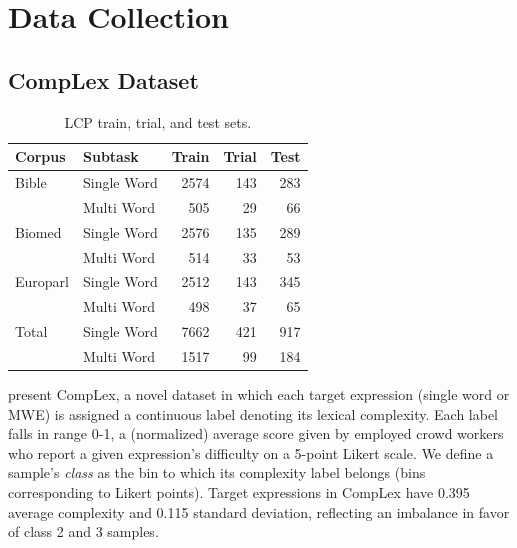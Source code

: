\documentclass{dcthesis}
\theoremstyle{definition}
\theoremstyle{remark}
\begin{document}
\chapter{Data Collection}

\section{CompLex Dataset}

\begin{table}
  \centering
  \begin{tabular}{l|l|r|r|r}
    \toprule
    \centering
    Corpus & Subtask & Train &  Trial &  Test \\
    \midrule
    Bible & Single Word &   2574 &    143 &   283 \\
            & Multi Word &    505 &     29 &    66 \\
    Biomed & Single Word &   2576 &    135 &   289 \\
            & Multi Word &    514 &     33 &    53 \\
    Europarl & Single Word &   2512 &    143 &   345 \\
            & Multi Word &    498 &     37 &    65 \\
    \midrule
    Total & Single Word & 7662 & 421 & 917 \\
          & Multi Word &    1517 &     99 &    184 \\
    \bottomrule
  \end{tabular}
  \caption{\label{tab:datasets} LCP train, trial, and test sets.}
\end{table}

\citet{shardlow2020complex} present CompLex, a novel dataset in which each target expression (single word or MWE) is assigned a continuous label denoting its lexical complexity. Each label falls in range 0-1, a (normalized) average score given by employed crowd workers who report a given expression's difficulty on a 5-point Likert scale. We define a sample's \textit{class} as the bin to which its complexity label belongs (bins corresponding to Likert points). Target expressions in CompLex have 0.395 average complexity and 0.115 standard deviation, reflecting an imbalance in favor of class 2 and 3 samples.
\end{document}
